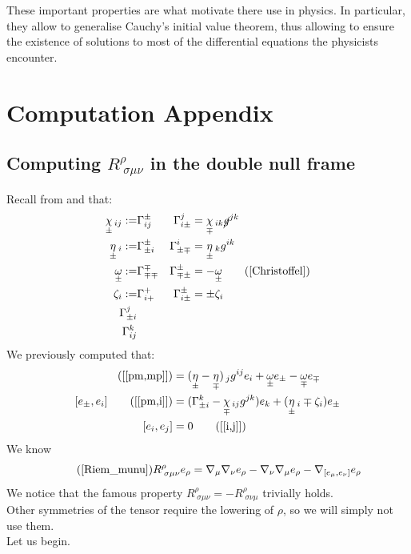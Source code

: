 \documentclass[a4paper,11pt]{article}
\numberwithin{equation}{section}
\theoremstyle{definition}
\begin{document}
These important properties are what motivate there use in physics. In particular, they allow to generalise Cauchy's initial value theorem, thus allowing to ensure the existence of solutions to most of the differential equations the physicists encounter.

\newpage
\section{Computation Appendix}
\subsection{Computing $R^\rho_{\;\sigma\mu\nu}$ in the double null frame} \label{CompR}
Recall from \cite{Art} and \cite{Chris} that:
\begin{align*}
    \underset{\pm}{\chi}\,_{ij} :=&\Gamma_{ij}^\pm &\Gamma_{i\pm}^j&=\underset{\mp}{\chi}\,_{ik}\cancel{g}^{jk}\\
    \underset{\pm}{\eta}\,_i :=&\Gamma_{\pm i}^\pm &\Gamma_{\pm\mp}^i&=\underset{\pm}{\eta}\,_kg^{ik}\\
    \underset{\pm}{\omega}:=&\Gamma_{\mp\mp}^\mp &\Gamma_{\mp\pm}^\pm&=-\underset{\pm}{\omega}\tag{\ref{Christoffel}}\\
    \zeta_i :=& \Gamma_{i+}^+ &\Gamma_{i\pm}^\pm&=\pm\zeta_i \\
    \Gamma_{\pm i}^j&\\
    \Gamma_{ij}^k&
\end{align*}
We previously computed that:
\begin{align}
    [e_\pm,e_\mp]\tag{\ref{[pm,mp]}}
    &=(\underset{\pm}{\eta}-\underset{\mp}{\eta})\,_jg^{ij} e_i+ \underset{\pm}{\omega} e_\pm - \underset{\mp}{\omega} e_\mp\\
    [e_\pm,e_i]\tag{\ref{[pm,i]}}&=(\Gamma_{\pm i}^k - \underset{\mp}{\chi}\,_{ij}g^{jk}) e_k + (\underset{\pm}{\eta}\,_i \mp \zeta_i) e_\pm\\
[e_i,e_j]&=0\tag{\ref{[i,j]}}
\end{align}
We know 
\begin{equation}\tag{\ref{Riem_munu}}
    R^\rho_{\;\sigma\mu\nu} e_\rho = \nabla_\mu\nabla_\nu e_\rho-\nabla_\nu\nabla_\mu e_\rho-\nabla_{[e_\mu,e_\nu]}e_\rho
\end{equation}
We notice that the famous property $R^\rho_{\;\sigma\mu\nu}=-R^\rho_{\;\sigma\nu\mu}$ trivially holds.\\
Other symmetries of the tensor require the lowering of $\rho$, so we will simply not use them.\\
Let us begin.
\end{document}
